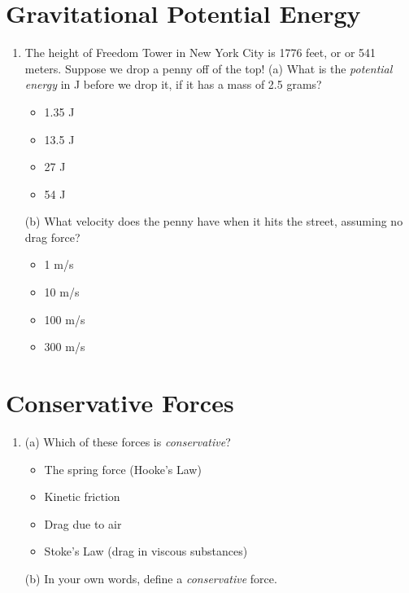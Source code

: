 \documentclass[10pt]{article}
\begin{document}
\section{Gravitational Potential Energy}
\begin{enumerate}
\item The height of Freedom Tower in New York City is 1776 feet, or or 541 meters.  Suppose we drop a penny off of the top!  (a) What is the \textit{potential energy} in J before we drop it, if it has a mass of 2.5 grams?
\begin{itemize}
\item 1.35 J
\item 13.5 J
\item 27 J
\item 54 J
\end{itemize}
(b) What velocity does the penny have when it hits the street, assuming no drag force?
\begin{itemize}
\item 1 m/s
\item 10 m/s
\item 100 m/s
\item 300 m/s
\end{itemize}
\end{enumerate}
\section{Conservative Forces}
\begin{enumerate}
\item (a) Which of these forces is \textit{conservative}?
\begin{itemize}
\item The spring force (Hooke's Law)
\item Kinetic friction
\item Drag due to air
\item Stoke's Law (drag in viscous substances)
\end{itemize}
(b) In your own words, define a \textit{conservative} force.
\end{enumerate}
\end{document}
